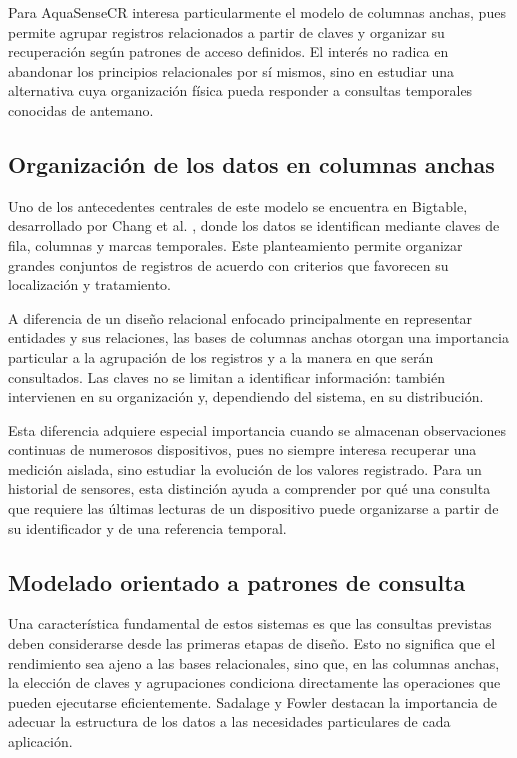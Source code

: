 \documentclass[conference]{IEEEtran}
\begin{document}
Para AquaSenseCR interesa particularmente el modelo de columnas anchas, pues permite agrupar registros relacionados a partir de claves y organizar su recuperación según patrones de acceso definidos. El interés no radica en abandonar los principios relacionales por sí mismos, sino en estudiar una alternativa cuya organización física pueda responder a consultas temporales conocidas de antemano.

\subsection{Organización de los datos en columnas anchas}

Uno de los antecedentes centrales de este modelo se encuentra en Bigtable, desarrollado por Chang et al. \cite{chang06}, donde los datos se identifican mediante claves de fila, columnas y marcas temporales. Este planteamiento permite organizar grandes conjuntos de registros de acuerdo con criterios que favorecen su localización y tratamiento.

A diferencia de un diseño relacional enfocado principalmente en representar entidades y sus relaciones, las bases de columnas anchas otorgan una importancia particular a la agrupación de los registros y a la manera en que serán consultados. Las claves no se limitan a identificar información: también intervienen en su organización y, dependiendo del sistema, en su distribución.

Esta diferencia adquiere especial importancia cuando se almacenan observaciones continuas de numerosos dispositivos, pues no siempre interesa recuperar una medición aislada, sino estudiar la evolución de los valores registrado. Para un historial de sensores, esta distinción ayuda a comprender por qué una consulta que requiere las últimas lecturas de un dispositivo puede organizarse a partir de su identificador y de una referencia temporal.

\subsection{Modelado orientado a patrones de consulta}

Una característica fundamental de estos sistemas es que las consultas previstas deben considerarse desde las primeras etapas de diseño. Esto no significa que el rendimiento sea ajeno a las bases relacionales, sino que, en las columnas anchas, la elección de claves y agrupaciones condiciona directamente las operaciones que pueden ejecutarse eficientemente. Sadalage y Fowler \cite{sadalage2012} destacan la importancia de adecuar la estructura de los datos a las necesidades particulares de cada aplicación.
\end{document}
